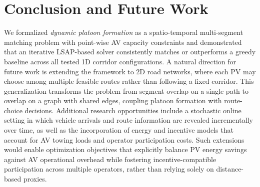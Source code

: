 \documentclass[sigconf]{acmart}
\begin{document}
\section{Conclusion and Future Work}
\label{sec:conclusion}
We formalized \emph{dynamic platoon formation} as a spatio-temporal multi-segment matching problem with point-wise AV capacity constraints and demonstrated that an iterative LSAP-based solver consistently matches or outperforms a greedy baseline across all tested 1D corridor configurations. A natural direction for future work is extending the framework to 2D road networks, where each PV may choose among multiple feasible routes rather than following a fixed corridor. This generalization transforms the problem from segment overlap on a single path to overlap on a graph with shared edges, coupling platoon formation with route-choice decisions. Additional research opportunities include a stochastic online setting in which vehicle arrivals and route information are revealed incrementally over time, as well as the incorporation of energy and incentive models that account for AV towing loads and operator participation costs. Such extensions would enable optimization objectives that explicitly balance PV energy savings against AV operational overhead while fostering incentive-compatible participation across multiple operators, rather than relying solely on distance-based proxies.
\end{document}
